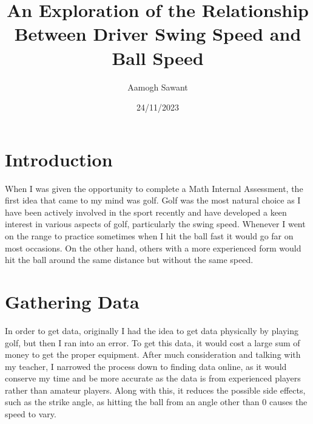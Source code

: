 \documentclass[12pt]{article}
\title{An Exploration of the Relationship Between Driver Swing Speed and Ball Speed}
\author{Aamogh Sawant}
\date{24/11/2023}
\begin{document}
\maketitle
\newpage
\tableofcontents  %
\newpage

\section{Introduction}
\hspace{1em}When I was given the opportunity to complete a Math Internal Assessment, the first idea that came to my mind was golf. Golf was the most natural choice as I have been actively involved in the sport recently and have developed a keen interest in various aspects of golf, particularly the swing speed. Whenever I went on the range to practice sometimes when I hit the ball fast it would go far on most occasions. On the other hand, others with a more experienced form would hit the ball around the same distance but without the same speed. 

\section{Gathering Data}
\hspace{1em}In order to get data, originally I had the idea to get data physically by playing golf, but then I ran into an error. To get this data, it would cost a large sum of money to get the proper equipment. After much consideration and talking with my teacher, I narrowed the process down to finding data online, as it would conserve my time and be more accurate as the data is from experienced players rather than amateur players. Along with this, it reduces the possible side effects, such as the strike angle, as hitting the ball from an angle other than 0 causes the speed to vary. 
\end{document}
